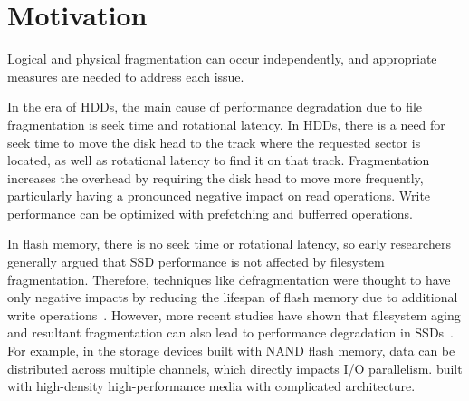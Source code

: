 \section{Motivation}\label{s:motivation}




%
%
%


Logical and physical fragmentation can occur independently, and appropriate measures are needed to address each issue.

In the era of HDDs, the main cause of performance degradation due to file fragmentation is seek time and rotational latency.
In HDDs, there is a need for seek time to move the disk head to the track where the requested sector is located, as well as rotational latency to find it on that track.
Fragmentation increases the overhead by requiring the disk head to move more frequently, particularly having a pronounced negative impact on read operations.
Write performance can be optimized with prefetching and bufferred operations.

In flash memory, there is no seek time or rotational latency, so early researchers generally argued that SSD performance is not affected by filesystem fragmentation.
Therefore, techniques like defragmentation were thought to have only negative impacts by reducing the lifespan of flash memory due to additional write operations~\cite{defrag-mobile:atc17,fragpicker:sosp21,defrag-lfs:apsys16,no-afraid:fast24,parallel-defrag:sac22,Defragmentation_read_collision}.
However, more recent studies have shown that filesystem aging and resultant fragmentation can also lead to performance degradation in SSDs~\cite{Problem_in_SSD_Empirical,senescence:fast17,Problem_in_SSD_Mobile_Devices,survey:ictc23}.
For example, in the storage devices built with NAND flash memory, data can be distributed across multiple channels, which directly impacts I/O parallelism.
built with high-density high-performance media with complicated architecture.

